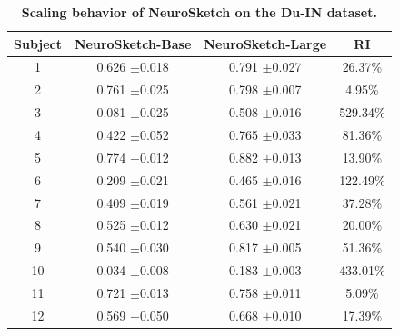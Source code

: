 \begin{table}[htbp]
\centering
\caption{\textbf{Scaling behavior of NeuroSketch on the Du-IN dataset.}}
\label{tab:Table.8}
\begin{tabular}{cccc}
\toprule
Subject & NeuroSketch-Base  & NeuroSketch-Large & RI\\ \midrule
1       & 0.626 {$\pm$0.018}   & 0.791 {$\pm$0.027}    &   26.37\%             \\
2       & 0.761 {$\pm$0.025}   & 0.798 {$\pm$0.007}    &   4.95\%             \\
3       & 0.081 {$\pm$0.025}   & 0.508 {$\pm$0.016}    &   529.34\%             \\
4       & 0.422 {$\pm$0.052}   & 0.765 {$\pm$0.033}    &   81.36\%             \\
5       & 0.774 {$\pm$0.012}   & 0.882 {$\pm$0.013}    &   13.90\%             \\
6       & 0.209 {$\pm$0.021}   & 0.465 {$\pm$0.016}    &   122.49\%             \\
7       & 0.409 {$\pm$0.019}   & 0.561 {$\pm$0.021}    &   37.28\%             \\
8       & 0.525 {$\pm$0.012}   & 0.630 {$\pm$0.021}    &   20.00\%             \\
9       & 0.540 {$\pm$0.030}   & 0.817 {$\pm$0.005}    &   51.36\%             \\
10      & 0.034 {$\pm$0.008}   & 0.183 {$\pm$0.003}    &   433.01\%             \\
11      & 0.721 {$\pm$0.013}   & 0.758 {$\pm$0.011}    &   5.09\%             \\
12      & 0.569 {$\pm$0.050}   & 0.668 {$\pm$0.010}    &   17.39\%             \\
\bottomrule
\end{tabular}
\end{table}